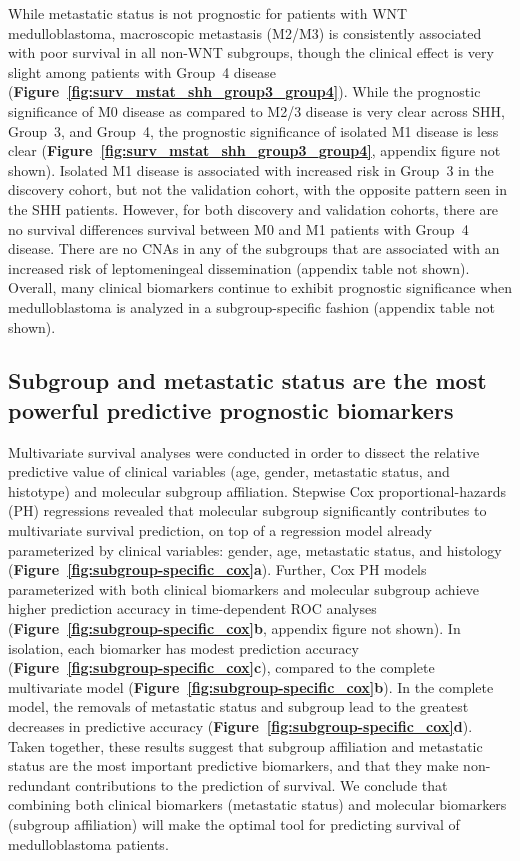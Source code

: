\documentclass[11pt,letterpaper]{article}
\theoremstyle{definition}
\newcommand{\citefig}[1]{\textbf{Figure~\ref{fig:#1}}}
\begin{document}
While metastatic status is not prognostic for patients with WNT medulloblastoma, macroscopic metastasis (M2/M3) is consistently associated with poor survival in all non-WNT subgroups, though the clinical effect is very slight among patients with Group~4 disease (\citefig{surv_mstat_shh_group3_group4}).  While the prognostic significance of M0 disease as compared to M2/3 disease is very clear across SHH, Group~3, and Group~4, the prognostic significance of isolated M1 disease is less clear (\citefig{surv_mstat_shh_group3_group4}, appendix figure not shown). Isolated M1 disease is associated with increased risk in Group~3 in the discovery cohort, but not the validation cohort, with the opposite pattern seen in the SHH patients. However, for both discovery and validation cohorts, there are no survival differences survival between M0 and M1 patients with Group~4 disease. There are no CNAs in any of the subgroups that are associated with an increased risk of leptomeningeal dissemination (appendix table not shown). Overall, many clinical biomarkers continue to exhibit prognostic significance when medulloblastoma is analyzed in a subgroup-specific fashion (appendix table not shown).

\subsection{Subgroup and metastatic status are the most powerful predictive prognostic biomarkers}

Multivariate survival analyses were conducted in order to dissect the relative predictive value of clinical variables (age, gender, metastatic status, and histotype) and molecular subgroup affiliation. Stepwise Cox proportional-hazards (PH) regressions revealed that molecular subgroup significantly contributes to multivariate survival prediction, on top of a regression model already parameterized by clinical variables: gender, age, metastatic status, and histology (\citefig{subgroup-specific_cox}\textbf{a}). Further, Cox PH models parameterized with both clinical biomarkers and molecular subgroup achieve higher prediction accuracy in time-dependent ROC analyses (\citefig{subgroup-specific_cox}\textbf{b}, appendix figure not shown). In isolation, each biomarker has modest prediction accuracy (\citefig{subgroup-specific_cox}\textbf{c}), compared to the complete multivariate model (\citefig{subgroup-specific_cox}\textbf{b}). In the complete model, the removals of metastatic status and subgroup lead to the greatest decreases in predictive accuracy (\citefig{subgroup-specific_cox}\textbf{d}). Taken together, these results suggest that subgroup affiliation and metastatic status are the most important predictive biomarkers, and that they make non-redundant contributions to the prediction of survival. We conclude that combining both clinical biomarkers (metastatic status) and molecular biomarkers (subgroup affiliation) will make the optimal tool for predicting survival of medulloblastoma patients.
\end{document}
